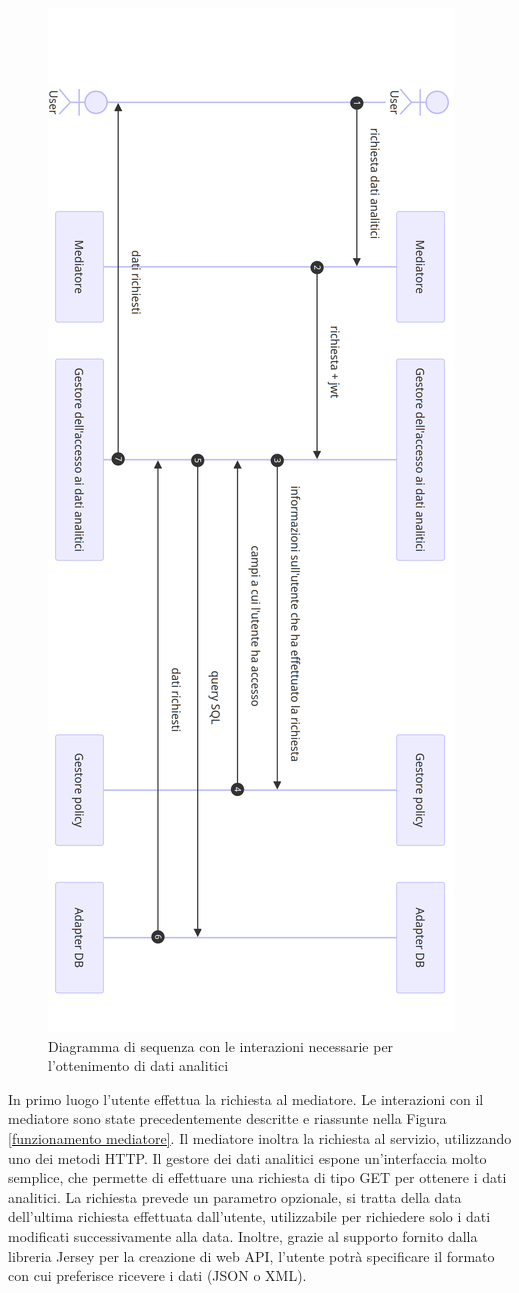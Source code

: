 \documentclass[12pt]{report}
\begin{document}
\begin{figure}[H]
    \centering
    \includegraphics[width=0.5\linewidth]{immagini/Gestore Dati analtici.png}
    \caption{Diagramma di sequenza con le interazioni necessarie per l'ottenimento di dati analitici}
    \label{fig:sequenza dati analitici}
\end{figure}
In primo luogo l'utente effettua la richiesta al mediatore. 
Le interazioni con il mediatore sono state precedentemente descritte e riassunte nella Figura \ref{funzionamento mediatore}.
Il mediatore inoltra la richiesta al servizio, utilizzando uno dei metodi HTTP.
Il gestore dei dati analitici espone un'interfaccia molto semplice, che permette di effettuare una richiesta di tipo GET per ottenere i dati analitici.
La richiesta prevede un parametro opzionale, si tratta della data dell'ultima richiesta effettuata dall'utente, utilizzabile per richiedere solo i dati modificati successivamente alla data.
Inoltre, grazie al supporto fornito dalla libreria Jersey per la creazione di web API, l'utente potrà specificare il formato con cui preferisce ricevere i dati (JSON o XML).
\end{document}
